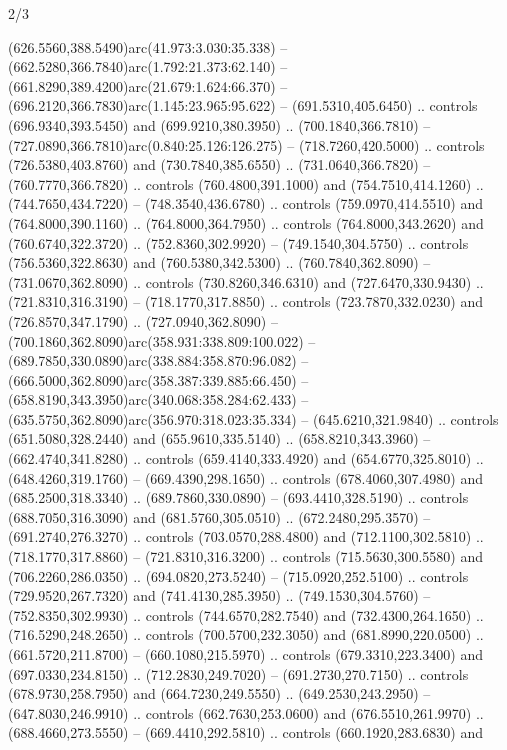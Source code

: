 \begin{flagdescription}{2/3}
\begin{scope}[xshift=0.5\flaglength,yshift=0.5\flagwidth,scale=\flagwidth/638.38]
\begin{scope}[y=0.80pt, x=0.80pt, yscale=-1,shift={(-600,-400)}]
\begin{scope}[shift={(-0.02,2.173)}]
  (626.5560,388.5490)arc(41.973:3.030:35.338) --
  (662.5280,366.7840)arc(1.792:21.373:62.140) --
  (661.8290,389.4200)arc(21.679:1.624:66.370) --
  (696.2120,366.7830)arc(1.145:23.965:95.622) -- (691.5310,405.6450) .. controls
  (696.9340,393.5450) and (699.9210,380.3950) .. (700.1840,366.7810) --
  (727.0890,366.7810)arc(0.840:25.126:126.275) -- (718.7260,420.5000) ..
  controls (726.5380,403.8760) and (730.7840,385.6550) .. (731.0640,366.7820) --
  (760.7770,366.7820) .. controls (760.4800,391.1000) and (754.7510,414.1260) ..
  (744.7650,434.7220) -- (748.3540,436.6780) .. controls (759.0970,414.5510) and
  (764.8000,390.1160) .. (764.8000,364.7950) .. controls (764.8000,343.2620) and
  (760.6740,322.3720) .. (752.8360,302.9920) -- (749.1540,304.5750) .. controls
  (756.5360,322.8630) and (760.5380,342.5300) .. (760.7840,362.8090) --
  (731.0670,362.8090) .. controls (730.8260,346.6310) and (727.6470,330.9430) ..
  (721.8310,316.3190) -- (718.1770,317.8850) .. controls (723.7870,332.0230) and
  (726.8570,347.1790) .. (727.0940,362.8090) --
  (700.1860,362.8090)arc(358.931:338.809:100.022) --
  (689.7850,330.0890)arc(338.884:358.870:96.082) --
  (666.5000,362.8090)arc(358.387:339.885:66.450) --
  (658.8190,343.3950)arc(340.068:358.284:62.433) --
  (635.5750,362.8090)arc(356.970:318.023:35.334) -- (645.6210,321.9840) ..
  controls (651.5080,328.2440) and (655.9610,335.5140) .. (658.8210,343.3960) --
  (662.4740,341.8280) .. controls (659.4140,333.4920) and (654.6770,325.8010) ..
  (648.4260,319.1760) -- (669.4390,298.1650) .. controls (678.4060,307.4980) and
  (685.2500,318.3340) .. (689.7860,330.0890) -- (693.4410,328.5190) .. controls
  (688.7050,316.3090) and (681.5760,305.0510) .. (672.2480,295.3570) --
  (691.2740,276.3270) .. controls (703.0570,288.4800) and (712.1100,302.5810) ..
  (718.1770,317.8860) -- (721.8310,316.3200) .. controls (715.5630,300.5580) and
  (706.2260,286.0350) .. (694.0820,273.5240) -- (715.0920,252.5100) .. controls
  (729.9520,267.7320) and (741.4130,285.3950) .. (749.1530,304.5760) --
  (752.8350,302.9930) .. controls (744.6570,282.7540) and (732.4300,264.1650) ..
  (716.5290,248.2650) .. controls (700.5700,232.3050) and (681.8990,220.0500) ..
  (661.5720,211.8700) -- (660.1080,215.5970) .. controls (679.3310,223.3400) and
  (697.0330,234.8150) .. (712.2830,249.7020) -- (691.2730,270.7150) .. controls
  (678.9730,258.7950) and (664.7230,249.5550) .. (649.2530,243.2950) --
  (647.8030,246.9910) .. controls (662.7630,253.0600) and (676.5510,261.9970) ..
  (688.4660,273.5550) -- (669.4410,292.5810) .. controls (660.1920,283.6830) and

\end{scope}
\end{scope}
\end{scope}
\end{flagdescription}
